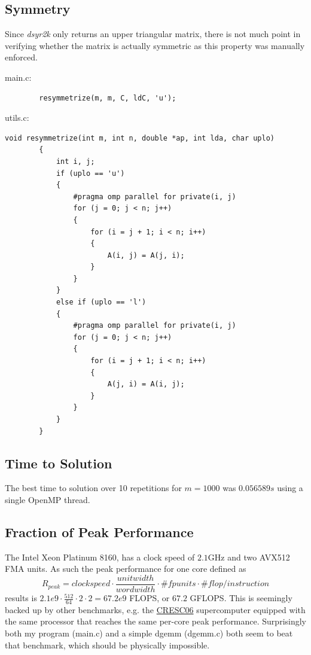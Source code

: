 \documentclass{scrartcl}
\begin{document}
	\subsection{Symmetry}
	Since \emph{dsyr2k} only returns an upper triangular matrix, there is not much point in verifying whether the matrix is actually symmetric as this property was manually enforced.
	
	main.c:
	\begin{verbatim}
		resymmetrize(m, m, C, ldC, 'u');
	\end{verbatim}
	
	utils.c:
	\begin{Verbatim}[tabsize=2]
		void resymmetrize(int m, int n, double *ap, int lda, char uplo)
		{
			int i, j;
			if (uplo == 'u')
			{
				#pragma omp parallel for private(i, j)
				for (j = 0; j < n; j++)
				{
					for (i = j + 1; i < n; i++)
					{
						A(i, j) = A(j, i);
					}
				}
			}
			else if (uplo == 'l')
			{
				#pragma omp parallel for private(i, j)
				for (j = 0; j < n; j++)
				{
					for (i = j + 1; i < n; i++)
					{
						A(j, i) = A(i, j);
					}
				}
			}
		}
	\end{Verbatim} 
	
	\subsection{Time to Solution}
	
	The best time to solution over 10 repetitions for $m=1000$ was $0.056589s$ using a single OpenMP thread.
	
	\subsection{Fraction of Peak Performance}
	The Intel Xeon Platinum 8160, has a clock speed of $2.1$GHz and two AVX512 FMA units.
	As such the peak performance for one core defined as 
	\begin{equation}
		R_{peak} = clock speed \cdot \frac{unit width}{word width} \cdot \#fpunits \cdot \#flop/instruction
	\end{equation}
	results is $2.1e9 \cdot \frac{512}{64} \cdot 2 \cdot 2 = 67.2e9$ FLOPS, or $67.2$ GFLOPS.
	This is seemingly backed up by other benchmarks, e.g. the \href{https://www.top500.org/system/179574/}{CRESC06} supercomputer equipped with the same processor that reaches the same per-core peak performance.
	Surprisingly both my program (main.c) and a simple dgemm (dgemm.c) both seem to beat that benchmark, which should be physically impossible.
	
\end{document}
